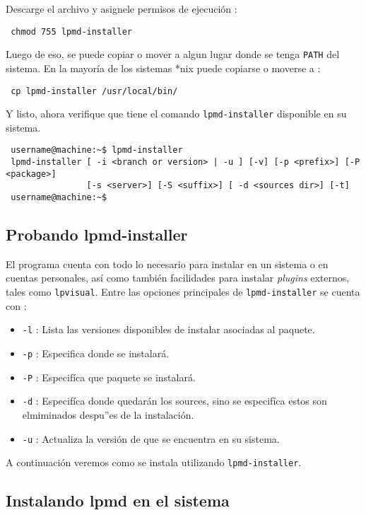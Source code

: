 Descarge el archivo y asignele permisos de ejecuci\'on :

\begin{verbatim}
 chmod 755 lpmd-installer
\end{verbatim}

Luego de eso, se puede copiar o mover a algun lugar donde se tenga \verb|PATH| del sistema. En la mayor\'ia de los sistemas *nix puede copiarse o moverse a :

\begin{verbatim}
 cp lpmd-installer /usr/local/bin/
\end{verbatim}

Y listo, ahora verifique que tiene el comando \verb|lpmd-installer| disponible en su sistema.
\begin{verbatim}
 username@machine:~$ lpmd-installer 
 lpmd-installer [ -i <branch or version> | -u ] [-v] [-p <prefix>] [-P <package>] 
                [-s <server>] [-S <suffix>] [ -d <sources dir>] [-t]
 username@machine:~$
\end{verbatim}

\subsection{Probando lpmd-installer}
El programa cuenta con todo lo necesario para instalar {\lpmd} en un sistema o en cuentas personales, as\'i como tambi\'en facilidades para instalar \textit{plugins} externos, tales como \verb|lpvisual|. Entre las opciones principales de \verb|lpmd-installer| se cuenta con :

\begin{itemize}
 \item \verb|-l| : Lista las versiones disponibles de instalar asociadas al paquete.
 \item \verb|-p| : Especifica donde se instalar\'a.
 \item \verb|-P| : Especif\'ica que paquete se instalar\'a.
 \item \verb|-d| : Especif\'ica donde quedar\'an los sources, sino se especif\'ica estos son elmiminados despu''es de la instalaci\'on.
 \item \verb|-u| : Actualiza la versi\'on de {\lpmd} que se encuentra en su sistema.
\end{itemize}

A continuaci\'on veremos como se instala {\lpmd} utilizando \verb|lpmd-installer|.

\subsection{Instalando lpmd en el sistema}

